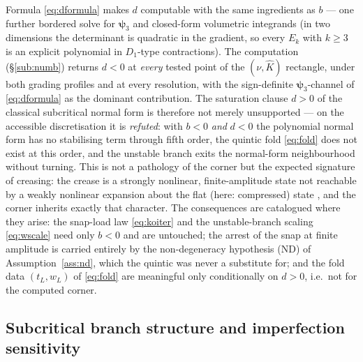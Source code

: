 \begin{remark}
    \label{rem:quinticstatus}
    Formula \eqref{eq:dformula} makes $d$ computable with the same ingredients as $b$ --- one further bordered solve
    for $\bm\psi_3$ and closed-form volumetric integrands (in two dimensions the determinant is quadratic in the
    gradient, so every $E_k$ with $k\ge3$ is an explicit polynomial in $D_1$-type contractions). The computation
    (\S\ref{sub:numb}) returns $d<0$ at \emph{every} tested point of the $(\nu,\hat K)$ rectangle, under both grading
    profiles and at every resolution, with the sign-definite $\bm\psi_3$-channel of \eqref{eq:dformula} as the
    dominant contribution. The saturation clause $d>0$ of the classical subcritical normal form is therefore not
    merely unsupported --- on the accessible discretisation it is \emph{refuted}: with $b<0$ \emph{and} $d<0$ the
    polynomial normal form has no stabilising term through fifth order, the quintic fold \eqref{eq:fold} does not
    exist at this order, and the unstable branch exits the normal-form neighbourhood without turning. This is not a
    pathology of the corner but the expected signature of creasing: the crease is a strongly nonlinear,
    finite-amplitude state not reachable by a weakly nonlinear expansion about the flat (here: compressed) state
    \cite{Hong2009}, and the corner inherits exactly that character. The consequences are catalogued where they
    arise: the snap-load law \eqref{eq:koiter} and the unstable-branch scaling \eqref{eq:wscale} need only $b<0$ and
    are untouched; the arrest of the snap at finite amplitude is carried entirely by the non-degeneracy hypothesis
    (ND) of Assumption~\ref{ass:nd}, which the quintic was never a substitute for; and the fold data $(t_L,w_L)$ of
    \eqref{eq:fold} are meaningful only conditionally on $d>0$, i.e.\ not for the computed corner.
\end{remark}

\subsection{Subcritical branch structure and imperfection sensitivity}
\label{sub:subcrit}

